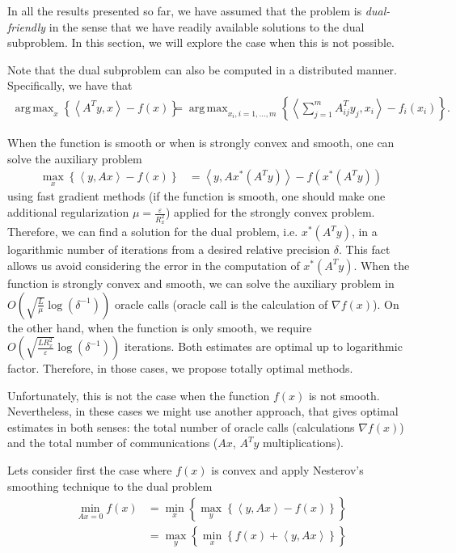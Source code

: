 \documentclass[final]{siamart1116}
\DeclareMathOperator*{\argmax}{arg\,max}
\numberwithin{theorem}{section}
\begin{document}
	In all the results presented so far, we have assumed that the problem is \textit{dual-friendly} in the sense that we have readily available solutions to the dual subproblem. In this section, we will explore the case when this is not possible.
	
	Note that the dual subproblem can also be computed in a distributed manner. Specifically, we have that
	\begin{align*}
	\argmax_x \left\lbrace \left\langle A^Ty,x \right\rangle -f(x) \right\rbrace  & = \argmax_{x_i, i=1,\hdots,m} \left\lbrace \left\langle \sum_{j=1}^{m} A^T_{ij }y_j,x_i \right\rangle -f_i(x_i) \right\rbrace.
	\end{align*}
	
	When the function is smooth or when is strongly convex and smooth, one can solve the auxiliary problem
	\begin{align*}
	\max_x \left\lbrace \left\langle y ,Ax \right\rangle  -f(x) \right\rbrace  & = \left\langle y ,Ax^*(A^Ty) \right\rangle  -f(x^*(A^Ty))
	\end{align*}
	using fast gradient methods (if the function is smooth, one should make one additional regularization $\mu  = \frac{\varepsilon}{R^2_x}$) applied for the strongly convex problem. Therefore, we can find a solution for the dual problem, i.e. $x^*(A^Ty)$, in a logarithmic number of iterations from a desired relative precision $\delta$. This fact allows us avoid considering the error in the computation of $x^*(A^Ty)$. When the function is strongly convex and smooth, we can solve the auxiliary problem in $O\left(  \sqrt{\frac{L}{\mu}} \log(\delta^{-1})\right) $ oracle calls (oracle call is the calculation of $\nabla f(x)$). On the other hand, when the function is only smooth, we require $O\left(  \sqrt{ \frac{LR_x^2}{\varepsilon} }\log (\delta^{-1})\right)$ iterations. Both estimates are optimal up to logarithmic factor. Therefore, in those cases, we propose totally optimal methods.
	
	Unfortunately, this is not the case when the function $f(x)$ is not smooth. Nevertheless, in these cases we might use another approach, that gives optimal estimates in both senses: the total number of oracle calls (calculations $\nabla f(x)$) and the total number of communications ($Ax$, $A^Ty$ multiplications).
	
	Lets consider first the case where $f(x)$ is convex and apply Nesterov's smoothing technique \cite{nes05,nam14} to the dual problem
	\begin{align}\label{nes_smooth}
	\min_{Ax=0} f(x) & = \min_x \left\lbrace \max_y \left\lbrace \left\langle y,Ax \right\rangle -f(x) \right\rbrace  \right\rbrace  \nonumber \\
	& = \max_y \left\lbrace \min_x \left\lbrace f(x) + \left\langle y,Ax \right\rangle  \right\rbrace  \right\rbrace
	\end{align}
	
\end{document}

